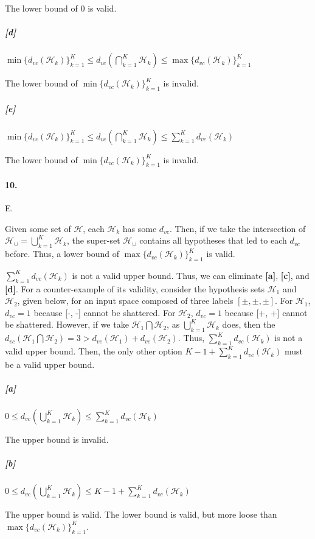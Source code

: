 \documentclass[10pt,letter]{article}
\begin{document}
		The lower bound of 0 is valid. 
	
	\subparagraph{[d]} 
		$\min\{d_{vc}(\mathcal H_k)\}_{k=1}^K \leq d_{vc}(\bigcap_{k=1}^K \mathcal H_k) \leq \max\{d_{vc}(\mathcal H_k)\}_{k=1}^K$
		
		The lower bound of $\min\{d_{vc}(\mathcal H_k)\}_{k=1}^K$ is invalid. 
	
	\subparagraph{[e]} 
		$\min\{d_{vc}(\mathcal H_k)\}_{k=1}^K \leq d_{vc}(\bigcap_{k=1}^K \mathcal H_k) \leq \sum_{k=1}^K d_{vc}(\mathcal H_k)$
		
		The lower bound of $\min\{d_{vc}(\mathcal H_k)\}_{k=1}^K$ is invalid. 

\paragraph{10.} E.
	
	Given some set of $\mathcal H$, each $\mathcal H_k$ has some $d_{vc}$. Then, if we take the intersection of $\mathcal H_\cup = \bigcup_{k=1}^K \mathcal H_k$, the super-set $\mathcal H_\cup$ contains all hypotheses that led to each $d_{vc}$ before. Thus, a lower bound of $\max\{d_{vc}(\mathcal H_k)\}_{k=1}^K$ is valid. 

	$\sum_{k=1}^K d_{vc}(\mathcal H_k)$ is not a valid upper bound. Thus, we can eliminate \textbf{[a]}, \textbf{[c]}, and \textbf{[d]}. For a counter-example of its validity, consider the hypothesis sets $\mathcal H_1$ and $\mathcal H_2$, given below, for an input space composed of three labels $[\pm, \pm, \pm]$. For $\mathcal H_1$, $d_{vc}=1$ because [-, -] cannot be shattered. For $\mathcal H_2$, $d_{vc}=1$ because [+, +] cannot be shattered. However, if we take $\mathcal H_1 \bigcap \mathcal H_2$, as $\bigcup_{k=1}^K \mathcal H_k$ does, then the $d_{vc}(\mathcal H_1 \bigcap \mathcal H_2) = 3 > d_{vc}(\mathcal H_1 ) + d_{vc}(\mathcal H_2)$. Thus, $\sum_{k=1}^K d_{vc}(\mathcal H_k)$ is not a valid upper bound. Then, the only other option $ K - 1 + \sum_{k=1}^K d_{vc}(\mathcal H_k)$ must be a valid upper bound.

	\subparagraph{[a]}
		$0 \leq d_{vc}(\bigcup_{k=1}^K \mathcal H_k) \leq \sum_{k=1}^K d_{vc}(\mathcal H_k)$

		The upper bound is invalid. 
	
	\subparagraph{[b]}
		$0 \leq d_{vc}(\bigcup_{k=1}^K \mathcal H_k) \leq K - 1 + \sum_{k=1}^K d_{vc}(\mathcal H_k)$

		The upper bound is valid. The lower bound is valid, but more loose than $\max\{d_{vc}(\mathcal H_k)\}_{k=1}^K$.
	
\end{document}
